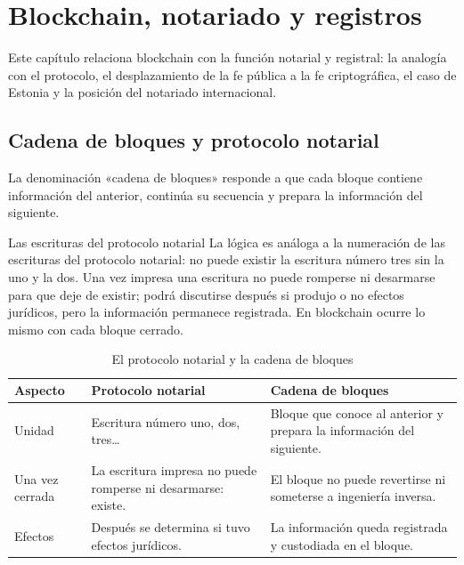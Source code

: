 \documentclass[12pt,oneside]{book}
\begin{document}
\chapter{Blockchain, notariado y registros}
\label{cap:notariadoblockchain}

Este capítulo relaciona blockchain con la función notarial y registral: la analogía con el protocolo, el desplazamiento de la fe pública a la fe criptográfica, el caso de Estonia y la posición del notariado internacional.

\section{Cadena de bloques y protocolo notarial}

La denominación «cadena de bloques» responde a que cada bloque contiene información del anterior, continúa su secuencia y prepara la información del siguiente.

\begin{example}{Las escrituras del protocolo notarial}
La lógica es análoga a la numeración de las escrituras del protocolo notarial: no puede existir la escritura número tres sin la uno y la dos. Una vez impresa una escritura no puede romperse ni desarmarse para que deje de existir; podrá discutirse después si produjo o no efectos jurídicos, pero la información permanece registrada. En blockchain ocurre lo mismo con cada bloque cerrado.
\end{example}

\begin{table}[H]
\centering
\caption{El protocolo notarial y la cadena de bloques}
\renewcommand{\arraystretch}{1.2}
\begin{tabularx}{\textwidth}{>{\raggedright\arraybackslash}p{}XX}
\toprule
\textbf{Aspecto} & \textbf{Protocolo notarial} & \textbf{Cadena de bloques} \\
\midrule
Unidad & Escritura número uno, dos, tres\ldots & Bloque que conoce al anterior y prepara la información del siguiente. \\
Una vez cerrada & La escritura impresa no puede romperse ni desarmarse: existe. & El bloque no puede revertirse ni someterse a ingeniería inversa. \\
Efectos & Después se determina si tuvo efectos jurídicos. & La información queda registrada y custodiada en el bloque. \\
\bottomrule
\end{tabularx}
\end{table}
\end{document}
